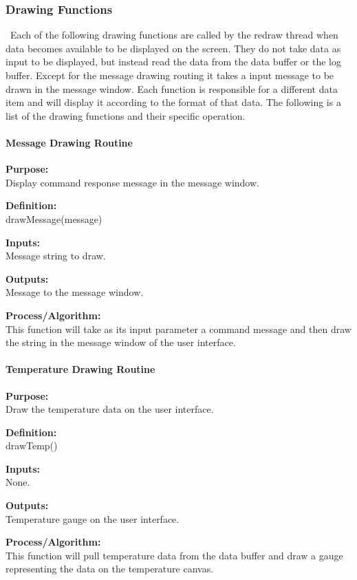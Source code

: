\documentclass[10pt,draftclsnofoot,onecolumn,retainorgcmds]{IEEEtran}
\begin{document}
\subsubsection{Drawing Functions}\
Each of the following drawing functions are called by the redraw thread when data becomes available to be displayed on the screen. They do not take data as input to be displayed, but instead read the data from the data buffer or the log buffer. Except for the message drawing routing it takes a input message to be drawn in the message window. Each function is responsible for a different data item and will display it according to the format of that data. The following is a list of the drawing functions and their specific operation.

\paragraph{Message Drawing Routine}
{\bf Purpose:} \\
Display command response message in the message window.  \par
{\bf Definition:} \\ 
drawMessage(message) \par
{\bf Inputs:} \\ Message string to draw.\par
{\bf Outputs:} \\Message to the message window. \par
{\bf Process/Algorithm:} \\
This function will take as its input parameter a command message and then draw the string in the message window of the user interface. \par

\paragraph{Temperature Drawing Routine}
{\bf Purpose:} \\
Draw the temperature data on the user interface.  \par
{\bf Definition:} \\ 
drawTemp() \par
{\bf Inputs:} \\None. \par
{\bf Outputs:} \\Temperature gauge on the user interface.\par
{\bf Process/Algorithm:} \\
This function will pull temperature data from the data buffer and draw a gauge representing the data on the temperature canvas. \par
\end{document}
